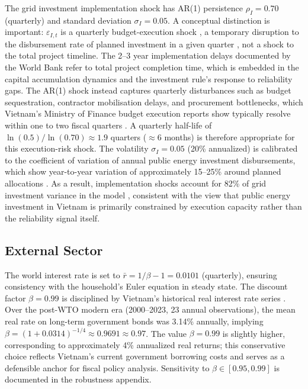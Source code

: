 \documentclass[12pt, a4paper]{article}
\begin{document}
	The grid investment implementation shock has AR(1) persistence $\rho_I = 0.70$ (quarterly) and standard deviation $\sigma_I = 0.05$. A conceptual distinction is important: $\varepsilon_{I,t}$ is a quarterly budget-execution shock ,  a temporary disruption to the disbursement rate of planned investment in a given quarter ,  not a shock to the total project timeline. The 2--3 year implementation delays documented by the World Bank \citep{worldbank2022} refer to total project completion time, which is embedded in the capital accumulation dynamics and the investment rule's response to reliability gaps. The AR(1) shock instead captures quarterly disturbances such as budget sequestration, contractor mobilisation delays, and procurement bottlenecks, which Vietnam's Ministry of Finance budget execution reports show typically resolve within one to two fiscal quarters \citep{mof2023}. A quarterly half-life of $\ln(0.5)/\ln(0.70) \approx 1.9$ quarters ($\approx$6 months) is therefore appropriate for this execution-risk shock. The volatility $\sigma_I = 0.05$ (20\% annualized) is calibrated to the coefficient of variation of annual public energy investment disbursements, which show year-to-year variation of approximately 15--25\% around planned allocations \citep{worldbank2022}. As a result, implementation shocks account for 82\% of grid investment variance in the model ,  consistent with the view that public energy investment in Vietnam is primarily constrained by execution capacity rather than the reliability signal itself.
	
	\subsection{External Sector} \label{subsec:external_sector}

	The world interest rate is set to $\bar{r} = 1/\beta - 1 = 0.0101$ (quarterly), ensuring consistency with the household's Euler equation in steady state. The discount factor $\beta = 0.99$ is disciplined by Vietnam's historical real interest rate series \citep{worldbank2024}. Over the post-WTO modern era (2000--2023, 23 annual observations), the mean real rate on long-term government bonds was 3.14\% annually, implying $\beta = (1 + 0.0314)^{-1/4} \approx 0.9691 \approx 0.97$. The value $\beta = 0.99$ is slightly higher, corresponding to approximately 4\% annualized real returns; this conservative choice reflects Vietnam's current government borrowing costs and serves as a defensible anchor for fiscal policy analysis. Sensitivity to $\beta \in [0.95, 0.99]$ is documented in the robustness appendix.
	
\end{document}
